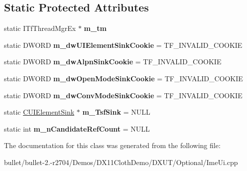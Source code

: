 \subsection*{Static Protected Attributes}
\begin{DoxyCompactItemize}
\item 
\hypertarget{class_c_tsf_ui_less_mode_ae82600873accd8164c8dceb029739393}{static I\+Tf\+Thread\+Mgr\+Ex $\ast$ {\bfseries m\+\_\+tm}}\label{class_c_tsf_ui_less_mode_ae82600873accd8164c8dceb029739393}

\item 
\hypertarget{class_c_tsf_ui_less_mode_a78c343eb54381ee7528f6d096f2ea97a}{static D\+W\+O\+R\+D {\bfseries m\+\_\+dw\+U\+I\+Element\+Sink\+Cookie} = T\+F\+\_\+\+I\+N\+V\+A\+L\+I\+D\+\_\+\+C\+O\+O\+K\+I\+E}\label{class_c_tsf_ui_less_mode_a78c343eb54381ee7528f6d096f2ea97a}

\item 
\hypertarget{class_c_tsf_ui_less_mode_a36db36f1cce013fa3b997e27be290542}{static D\+W\+O\+R\+D {\bfseries m\+\_\+dw\+Alpn\+Sink\+Cookie} = T\+F\+\_\+\+I\+N\+V\+A\+L\+I\+D\+\_\+\+C\+O\+O\+K\+I\+E}\label{class_c_tsf_ui_less_mode_a36db36f1cce013fa3b997e27be290542}

\item 
\hypertarget{class_c_tsf_ui_less_mode_aaa47232b016428259769cb867e32bef1}{static D\+W\+O\+R\+D {\bfseries m\+\_\+dw\+Open\+Mode\+Sink\+Cookie} = T\+F\+\_\+\+I\+N\+V\+A\+L\+I\+D\+\_\+\+C\+O\+O\+K\+I\+E}\label{class_c_tsf_ui_less_mode_aaa47232b016428259769cb867e32bef1}

\item 
\hypertarget{class_c_tsf_ui_less_mode_a3be419f7c78069c6fec4804c6142bf0c}{static D\+W\+O\+R\+D {\bfseries m\+\_\+dw\+Conv\+Mode\+Sink\+Cookie} = T\+F\+\_\+\+I\+N\+V\+A\+L\+I\+D\+\_\+\+C\+O\+O\+K\+I\+E}\label{class_c_tsf_ui_less_mode_a3be419f7c78069c6fec4804c6142bf0c}

\item 
\hypertarget{class_c_tsf_ui_less_mode_a55d1d32d509b97c92c926bdc7dab1fde}{static \hyperlink{class_c_tsf_ui_less_mode_1_1_c_u_i_element_sink}{C\+U\+I\+Element\+Sink} $\ast$ {\bfseries m\+\_\+\+Tsf\+Sink} = N\+U\+L\+L}\label{class_c_tsf_ui_less_mode_a55d1d32d509b97c92c926bdc7dab1fde}

\item 
\hypertarget{class_c_tsf_ui_less_mode_a6aade1d8d2e3780c811e2d7ff62a7b50}{static int {\bfseries m\+\_\+n\+Candidate\+Ref\+Count} = N\+U\+L\+L}\label{class_c_tsf_ui_less_mode_a6aade1d8d2e3780c811e2d7ff62a7b50}

\end{DoxyCompactItemize}


The documentation for this class was generated from the following file\+:\begin{DoxyCompactItemize}
\item 
bullet/bullet-\/2.-\/r2704/\+Demos/\+D\+X11\+Cloth\+Demo/\+D\+X\+U\+T/\+Optional/Ime\+Ui.\+cpp\end{DoxyCompactItemize}
